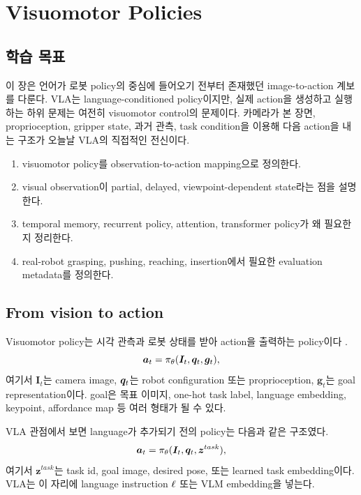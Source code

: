\chapter{Visuomotor Policies}

\section*{학습 목표}

이 장은 언어가 로봇 policy의 중심에 들어오기 전부터 존재했던 image-to-action 계보를 다룬다. VLA는 language-conditioned policy이지만, 실제 action을 생성하고 실행하는 하위 문제는 여전히 visuomotor control의 문제이다. 카메라가 본 장면, proprioception, gripper state, 과거 관측, task condition을 이용해 다음 action을 내는 구조가 오늘날 VLA의 직접적인 전신이다.

\begin{enumerate}
  \item visuomotor policy를 observation-to-action mapping으로 정의한다.
  \item visual observation이 partial, delayed, viewpoint-dependent state라는 점을 설명한다.
  \item temporal memory, recurrent policy, attention, transformer policy가 왜 필요한지 정리한다.
  \item real-robot grasping, pushing, reaching, insertion에서 필요한 evaluation metadata를 정의한다.
\end{enumerate}

\section{From vision to action}

Visuomotor policy는 시각 관측과 로봇 상태를 받아 action을 출력하는 policy이다 \cite{levine2016gps,ebert2018visualforesight,florence2021transporter,cliport2022}.
\begin{equation}
  \bm{a}_t
  =
  \pi_{\theta}(\bm{I}_t,\bm{q}_t,\bm{g}_t),
  \label{eq:visuomotor-policy-basic}
\end{equation}
여기서 $\bm{I}_t$는 camera image, $\bm{q}_t$는 robot configuration 또는 proprioception, $\bm{g}_t$는 goal representation이다. goal은 목표 이미지, one-hot task label, language embedding, keypoint, affordance map 등 여러 형태가 될 수 있다.

VLA 관점에서 보면 language가 추가되기 전의 policy는 다음과 같은 구조였다.
\begin{equation}
  \bm{a}_t
  =
  \pi_{\theta}(\bm{I}_t,\bm{q}_t,\bm{z}^{task}),
  \label{eq:task-conditioned-visuomotor}
\end{equation}
여기서 $\bm{z}^{task}$는 task id, goal image, desired pose, 또는 learned task embedding이다. VLA는 이 자리에 language instruction $\ell$ 또는 VLM embedding을 넣는다.

